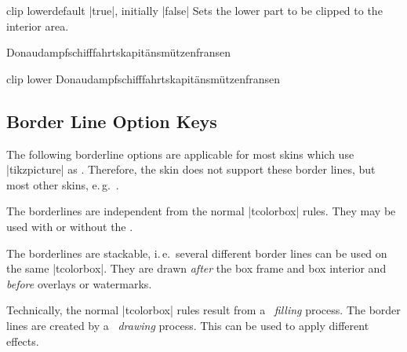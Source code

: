 \begin{docTcbKey}{clip lower}{}{default |true|, initially |false|}
  Sets the lower part to be clipped to the interior area.
\begin{dispExample}

\begin{tcblisting}{}
Donau\-dampf\-schiff\-fahrts\-ka\-pi\-t\"ans\-m\"ut\-zen\-fran\-sen
\end{tcblisting}

\begin{tcblisting}{clip lower}
Donau\-dampf\-schiff\-fahrts\-ka\-pi\-t\"ans\-m\"ut\-zen\-fran\-sen
\end{tcblisting}
\end{dispExample}
\end{docTcbKey}


\clearpage
\subsection{Border Line Option Keys}\label{subsec:borderline}
The following borderline options are applicable for most skins which
use |tikzpicture| as .
Therefore, the skin  does not support these border lines,
but most other skins, e.\,g.\ .

The borderlines are independent from the normal |tcolorbox| rules.
They may be used with or without the .

The borderlines are stackable, i.\,e.\ several different border lines can be
used on the same |tcolorbox|. They are drawn \emph{after} the box frame and box
interior and \emph{before} overlays or watermarks.

\begin{marker}
Technically, the normal |tcolorbox| rules result from a \tikzname\  \emph{filling}
process. The border lines are created by a \tikzname\  \emph{drawing} process.
This can be used to apply different effects.
\end{marker}


